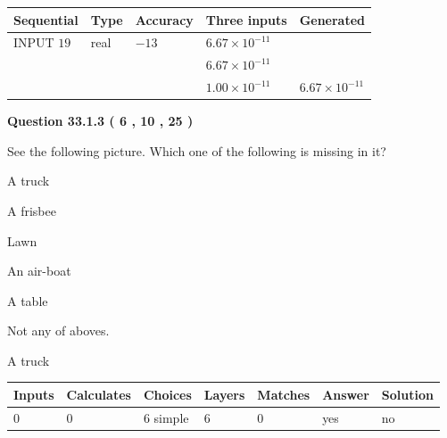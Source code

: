 \documentclass[12pt]{article}
\begin{document}
   
  
  
\noindent\begin{tabular}{|l|l|l|l|l|}
\hline
 Sequential & Type & Accuracy & Three inputs & Generated \\ 
\hline
 
 
  INPUT $           19 $ & real & $          -13  $ & $
 6.67 \times 10^{-11}
  $ & \\
  & & &  $
 6.67 \times 10^{-11}
  $ & \\
  & & &  $
 1.00 \times 10^{-11}
 $ & $ 6.67 \times 10^{-11} $ 
 \\  \hline  
 \end{tabular}
   
   
  
\vspace{0.2in}
  
{\textbf{\Large{Question
33.1.3 
 (           6 ,          10 ,          25 )
}}}
  
  
See the following picture.
Which one of the following is missing in it?
 
 
A truck
 
 
A frisbee
 
 
Lawn
 
 
An air-boat
 
 
A table
 
 
  Not any of aboves.
 
 
\noindent{}
 
 
A truck
 
 
\noindent{}
 
 
 
\vspace{0.3in}
   
   
   
   
\noindent\begin{tabular}{|l|l|l|l|l|l|l|}
 \hline
Inputs & Calculates & Choices & Layers & Matches & Answer & Solution \\ \hline
           0  & 
           0  & 
           6
  simple  
  & 
           6  & 
           0  & 
  yes & 
  no 
  \\ \hline
 \end{tabular}
   
\end{document}
